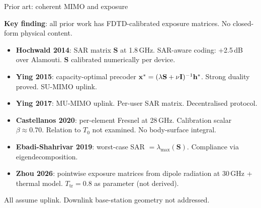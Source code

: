 \begin{frame}[label=app-lit-mimo]{Prior art: coherent MIMO and exposure}

  \textbf{Key finding}: all prior work has FDTD-calibrated exposure matrices. No closed-form physical content.

  \vspace{6pt}
  {\small
  \begin{itemize}
    \item \textbf{Hochwald 2014}: SAR matrix $\mathbf{S}$ at 1.8\,GHz. SAR-aware coding: +2.5\,dB over Alamouti. $\mathbf{S}$ calibrated numerically per device.
    \item \textbf{Ying 2015}: capacity-optimal precoder $\mathbf{x}^* = (\lambda\mathbf{S}+\nu\mathbf{I})^{-1}\mathbf{h}^*$. Strong duality proved. SU-MIMO uplink.
    \item \textbf{Ying 2017}: MU-MIMO uplink. Per-user SAR matrix. Decentralised protocol.
    \item \textbf{Castellanos 2020}: per-element Fresnel at 28\,GHz. Calibration scalar $\beta \approx 0.70$. Relation to $T_0$ not examined. No body-surface integral.
    \item \textbf{Ebadi-Shahrivar 2019}: worst-case SAR $= \lambda_{\max}(\mathbf{S})$. Compliance via eigendecomposition.
    \item \textbf{Zhou 2026}: pointwise exposure matrices from dipole radiation at 30\,GHz + thermal model. $T_{\mathrm{tr}} = 0.8$ as parameter (not derived).
  \end{itemize}
  }

  \vspace{4pt}
  {\footnotesize All assume uplink. Downlink base-station geometry not addressed.}

  \vspace{4pt}
\end{frame}


